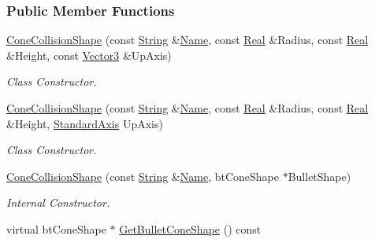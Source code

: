 \subsubsection*{Public Member Functions}
\begin{DoxyCompactItemize}
\item 
\hyperlink{classMezzanine_1_1ConeCollisionShape_aec0129e435def8d4299a6a7df6ecfd82}{ConeCollisionShape} (const \hyperlink{namespaceMezzanine_acf9fcc130e6ebf08e3d8491aebcf1c86}{String} \&\hyperlink{classMezzanine_1_1CollisionShape_aac524c5c56fa4d158bc071f8aecfbe79}{Name}, const \hyperlink{namespaceMezzanine_a726731b1a7df72bf3583e4a97282c6f6}{Real} \&Radius, const \hyperlink{namespaceMezzanine_a726731b1a7df72bf3583e4a97282c6f6}{Real} \&Height, const \hyperlink{classMezzanine_1_1Vector3}{Vector3} \&UpAxis)
\begin{DoxyCompactList}\small\item\em Class Constructor. \item\end{DoxyCompactList}\item 
\hyperlink{classMezzanine_1_1ConeCollisionShape_a33a0f529da45a509f8961f4c9a490b3e}{ConeCollisionShape} (const \hyperlink{namespaceMezzanine_acf9fcc130e6ebf08e3d8491aebcf1c86}{String} \&\hyperlink{classMezzanine_1_1CollisionShape_aac524c5c56fa4d158bc071f8aecfbe79}{Name}, const \hyperlink{namespaceMezzanine_a726731b1a7df72bf3583e4a97282c6f6}{Real} \&Radius, const \hyperlink{namespaceMezzanine_a726731b1a7df72bf3583e4a97282c6f6}{Real} \&Height, \hyperlink{namespaceMezzanine_ab41a00a8c6a47b576dc987ec34e16ba1}{StandardAxis} UpAxis)
\begin{DoxyCompactList}\small\item\em Class Constructor. \item\end{DoxyCompactList}\item 
\hyperlink{classMezzanine_1_1ConeCollisionShape_ad80439a195cf4f2df8d2cd4b8ebaf062}{ConeCollisionShape} (const \hyperlink{namespaceMezzanine_acf9fcc130e6ebf08e3d8491aebcf1c86}{String} \&\hyperlink{classMezzanine_1_1CollisionShape_aac524c5c56fa4d158bc071f8aecfbe79}{Name}, btConeShape $\ast$BulletShape)
\begin{DoxyCompactList}\small\item\em Internal Constructor. \item\end{DoxyCompactList}\item 
virtual btConeShape $\ast$ \hyperlink{classMezzanine_1_1ConeCollisionShape_aff8623fa14d66fce32738ff075c1cc7c}{GetBulletConeShape} () const 

\end{DoxyCompactItemize}
